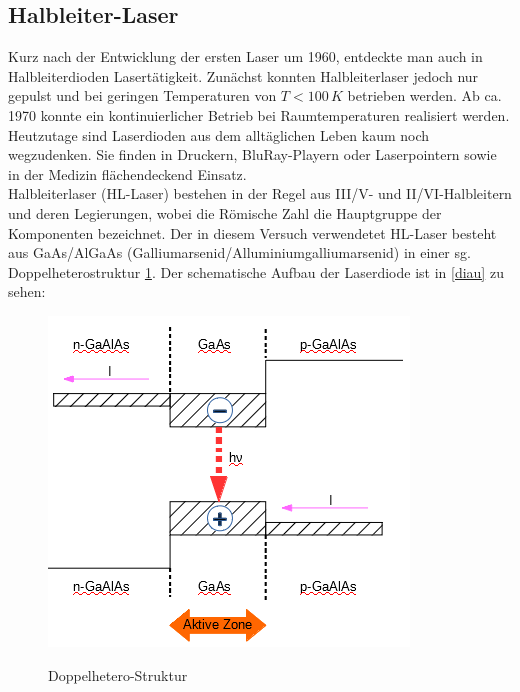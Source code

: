 \documentclass[twoside,colorback,accentcolor=tud4c,11pt]{tudreport}
\begin{document}
\subsection{Halbleiter-Laser}
Kurz nach der Entwicklung der ersten Laser um 1960, entdeckte man auch in Halbleiterdioden Lasertätigkeit. Zunächst konnten Halbleiterlaser jedoch nur gepulst und bei geringen Temperaturen von $T<100\,\si{K}$ betrieben werden. Ab ca. 1970 konnte ein kontinuierlicher Betrieb bei Raumtemperaturen realisiert werden. Heutzutage sind Laserdioden aus dem alltäglichen Leben kaum noch wegzudenken. Sie finden in Druckern, BluRay-Playern oder Laserpointern sowie in der Medizin flächendeckend Einsatz.\\
Halbleiterlaser (HL-Laser) bestehen in der Regel aus III/V- und II/VI-Halbleitern und deren Legierungen, wobei die Römische Zahl die Hauptgruppe der Komponenten bezeichnet. Der in diesem Versuch verwendetet HL-Laser besteht aus GaAs/AlGaAs (Galliumarsenid/Alluminiumgalliumarsenid) in einer sg. Doppelheterostruktur \ref{dophet}. Der schematische Aufbau der Laserdiode ist in \ref{diau} zu sehen:
\begin{figure}[H]
\centering
   	\begin{minipage}[b]{0.6\textwidth}
   	\includegraphics[width=\textwidth]{graphics/doppelhetero.PNG}
  	\label{dophet}
   	\end{minipage}
\caption{Doppelhetero-Struktur}\cite{anl}
\end{figure}
\end{document}
